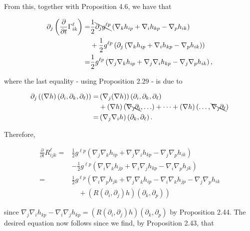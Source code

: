 \documentclass[10pt, letterpaper]{article}
\begin{document}
From this, together with Proposition 4.6, we have that

$$
\begin{aligned}
\partial_{j}\left(\frac{\partial}{\partial t} \Gamma_{i k}^{\ell}\right)= & \frac{1}{2} \bcancel{\partial_{j} g^{\ell p}}\left(\nabla_{k} h_{i p}+\nabla_{i} h_{k p}-\nabla_{p} h_{i k}\right) \\
& +\frac{1}{2} g^{\ell p}\left(\partial_{j}\left(\nabla_{k} h_{i p}+\nabla_{i} h_{k p}-\nabla_{p} h_{i k}\right)\right) \\
= & \frac{1}{2} g^{\ell p}\left(\nabla_{j} \nabla_{k} h_{i p}+\nabla_{j} \nabla_{i} h_{k p}-\nabla_{j} \nabla_{p} h_{i k}\right),
\end{aligned}
$$

where the last equality - using Proposition 2.29 - is due to

$$
\begin{aligned}
\partial_{j}\left((\nabla h)\left(\partial_{i}, \partial_{k}, \partial_{\ell}\right)\right)
= & \left(\nabla_{j}(\nabla h)\right)\left(\partial_{i}, \partial_{k}, \partial_{\ell}\right) \\
& +(\nabla h)\left(\bcancel{\nabla_{\jmath} \partial_{i}}, \ldots\right)+\cdots+(\nabla h)\left(\ldots, \bcancel{\nabla_{\jmath} \partial_{\ell}}\right) \\
= & \left(\nabla_{j} \nabla_{i} h\right)\left(\partial_{k}, \partial_{\ell}\right) .
\end{aligned}
$$

Therefore,

$$
\begin{aligned}
\frac{\partial}{\partial t} R_{i j k}^{\ell}= & \frac{1}{2} g^{\ell p}\left(\nabla_{j} \nabla_{k} h_{i p}+\nabla_{j} \nabla_{i} h_{k p}-\nabla_{j} \nabla_{p} h_{i k}\right) \\
& -\frac{1}{2} g^{\ell p}\left(\nabla_{i} \nabla_{k} h_{j p}+\nabla_{i} \nabla_{j} h_{k p}-\nabla_{i} \nabla_{p} h_{j k}\right) \\
= & \frac{1}{2} g^{\ell p}\left(\nabla_{i} \nabla_{p} h_{j k}+\nabla_{j} \nabla_{k} h_{i p}-\nabla_{i} \nabla_{k} h_{j p}-\nabla_{j} \nabla_{p} h_{i k}\right. \\
& \left.\quad+\left(R\left(\partial_{i}, \partial_{j}\right) h\right)\left(\partial_{k}, \partial_{p}\right)\right)
\end{aligned}
$$

since $\nabla_{j} \nabla_{i} h_{k p}-\nabla_{i} \nabla_{j} h_{k p}=\left(R\left(\partial_{i}, \partial_{j}\right) h\right)\left(\partial_{k}, \partial_{p}\right)$ by Proposition 2.44. The desired equation now follows since we find, by Proposition 2.43, that
\end{document}
